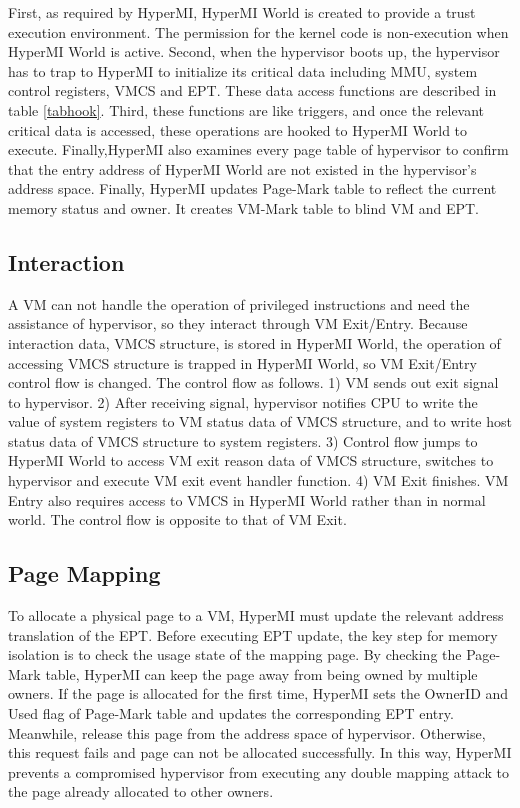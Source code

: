 \documentclass[conference]{IEEEtran}
\begin{document}
First, as required by HyperMI, HyperMI World is created to provide a trust execution environment. The permission for the kernel code is non-execution when HyperMI World is active. 
Second, when the hypervisor boots up, the hypervisor has to trap to HyperMI to initialize its critical data including MMU, system control registers, VMCS and EPT. These data access functions are described in table \ref{tabhook}.
Third, these functions are like triggers, and once the relevant critical data is accessed, these operations are hooked to HyperMI World to execute. 
Finally,HyperMI also examines every page table of hypervisor to confirm that the entry address of HyperMI World are not existed in the hypervisor's address space. 
Finally, HyperMI updates Page-Mark table to reflect the current memory status and owner. It creates VM-Mark table to blind VM and EPT.


\subsection {Interaction}

A VM can not handle the operation of privileged instructions and need the assistance of hypervisor, so they interact through VM Exit/Entry. Because interaction data, VMCS structure, is stored in HyperMI World, the operation of accessing VMCS structure is trapped in HyperMI World, so VM Exit/Entry control flow is changed. The control flow as follows. 1) VM sends out exit signal to hypervisor. 2) After receiving signal, hypervisor notifies CPU to write the value of system registers to VM status data of VMCS structure, and to write host status data of VMCS structure to system registers. 3) Control flow jumps to HyperMI World to access VM exit reason data of VMCS structure, switches to hypervisor and execute VM exit event handler function. 4) VM Exit finishes.
VM Entry also requires access to VMCS in HyperMI World rather than in normal world. The control flow is opposite to that of VM Exit.

\subsection {Page Mapping}

To allocate a physical page to a VM, HyperMI must update the relevant address translation of the EPT.
Before executing EPT update, the key step for memory isolation is to check the usage state of the mapping page. 
By checking the Page-Mark table, HyperMI can keep the page away from being owned by multiple owners. If the page is allocated for the first time, HyperMI sets the OwnerID and Used flag of Page-Mark table and updates the corresponding EPT entry. Meanwhile, release this page from the address space of hypervisor. Otherwise, this request fails and page can not be allocated successfully. In this way, HyperMI prevents a compromised hypervisor from executing any double mapping attack to the page already allocated to other owners.
\end{document}

